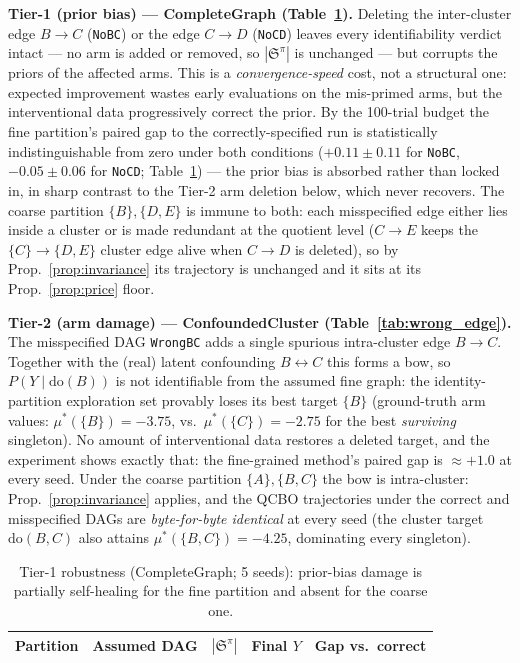 \documentclass{article}
\renewcommand{\do}{\mathrm{do}}
\newcommand{\QCBO}{\textsc{QCBO}}
\newcommand{\ESpi}{\mathfrak{S}^{\pi}}
\begin{document}
\textbf{Tier-1 (prior bias) --- CompleteGraph
(Table~\ref{tab:wrong_edge_cg}).} Deleting the inter-cluster edge $B \to
C$ (\texttt{NoBC}) or the edge $C \to D$ (\texttt{NoCD}) leaves every
identifiability verdict intact --- no arm is added or removed, so $|\ESpi|$
is unchanged --- but corrupts the priors of the affected arms. This is a
\emph{convergence-speed} cost, not a structural one: expected improvement
wastes early evaluations on the mis-primed arms, but the interventional data
progressively correct the prior. By the 100-trial budget the fine partition's
paired gap to the correctly-specified run is statistically indistinguishable
from zero under both conditions ($+0.11 \pm 0.11$ for \texttt{NoBC},
$-0.05 \pm 0.06$ for \texttt{NoCD}; Table~\ref{tab:wrong_edge_cg}) --- the
prior bias is absorbed rather than locked in, in sharp contrast to the Tier-2
arm deletion below, which never recovers.
The coarse partition $\{B\},\{D,E\}$ is immune to both: each misspecified
edge either lies inside a cluster or is made redundant at the quotient
level ($C \to E$ keeps the $\{C\}\to\{D,E\}$ cluster edge alive when
$C \to D$ is deleted), so by Prop.~\ref{prop:invariance} its trajectory is
unchanged and it sits at its Prop.~\ref{prop:price} floor.

\textbf{Tier-2 (arm damage) --- ConfoundedCluster
(Table~\ref{tab:wrong_edge}).} The misspecified DAG \texttt{WrongBC} adds a
single spurious intra-cluster edge $B \to C$. Together with the (real) latent
confounding $B \leftrightarrow C$ this forms a bow, so $P(Y \mid \do(B))$ is
not identifiable from the assumed fine graph: the identity-partition
exploration set provably loses its best target $\{B\}$ (ground-truth arm
values: $\mu^*(\{B\}) = -3.75$, vs.\ $\mu^*(\{C\}) = -2.75$ for the best
\emph{surviving} singleton). No amount of interventional data restores a
deleted target, and the experiment shows exactly that: the fine-grained
method's paired gap is $\approx +1.0$ at every seed. Under the coarse
partition $\{A\},\{B,C\}$ the bow is intra-cluster:
Prop.~\ref{prop:invariance} applies, and the \QCBO{} trajectories under the
correct and misspecified DAGs are \emph{byte-for-byte identical} at every seed
(the cluster target $\do(B,C)$ also attains $\mu^*(\{B,C\}) = -4.25$,
dominating every singleton).

\begin{table}[t]
  \centering
  \caption{Tier-1 robustness (CompleteGraph; 5 seeds): prior-bias
  damage is partially self-healing for the fine partition and absent for
  the coarse one.}
  \label{tab:wrong_edge_cg}
  \vspace{4pt}
  \small
  \begin{tabular}{@{}llccc@{}}
    \toprule
    \textbf{Partition} & \textbf{Assumed DAG} & $|\ESpi|$ &
    \textbf{Final $Y$} & \textbf{Gap vs.\ correct} \\
    \midrule
    
  \end{tabular}
\end{table}
\end{document}
